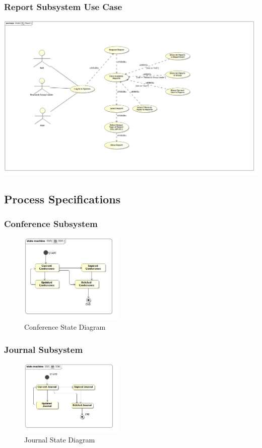 \documentclass{article}
\begin{document}
			\subsubsection{Report Subsystem Use Case}
				\includegraphics[width=\textwidth]{ReportUseCase}
		\subsection{Process Specifications}
			\subsubsection{Conference Subsystem}
				\begin{figure}[h]
					\centerline{\includegraphics[width=186px]{5.4-SS5-7/SS5}}
					\caption{Conference State Diagram}
				\end{figure}
				\newpage
			\subsubsection{Journal Subsystem}
				\begin{figure}[h]
					\centerline{\includegraphics[width=186px]{5.4-SS5-7/SS6}}
					\caption{Journal State Diagram}
				\end{figure}
\end{document}
